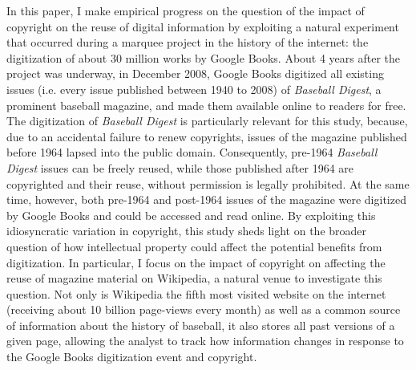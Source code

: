 \documentclass[11pt]{article}
\begin{document}
In this paper, I make empirical progress on the question of the impact of copyright on the reuse of digital information by exploiting a natural experiment that occurred during a marquee project in the history of the internet: the digitization of about 30 million works by Google Books. About 4 years after the project was underway, in December 2008, Google Books digitized all existing issues (i.e. every issue published between 1940 to 2008) of \emph{Baseball Digest}, a prominent baseball magazine, and made them available online to readers for free. The digitization of \emph{Baseball Digest} is particularly relevant for this study, because, due to an accidental failure to renew copyrights, issues of the magazine published before 1964 lapsed into the public domain. Consequently, pre-1964 \emph{Baseball Digest} issues can be freely reused, while those published after 1964 are copyrighted and their reuse, without permission is legally prohibited. At the same time, however, both pre-1964 and post-1964 issues of the magazine were digitized by Google Books and could be accessed and read online. By exploiting this idiosyncratic variation in copyright, this study sheds light on the broader question of how intellectual property could affect the potential benefits from digitization. In particular, I focus on the impact of copyright on affecting the reuse of magazine material on Wikipedia, a natural venue to investigate this question. Not only is Wikipedia the fifth most visited website on the internet (receiving about 10 billion page-views every month) as well as a common source of information about the history of baseball, it also stores all past versions of a given page, allowing the analyst to track how information changes in response to the Google Books digitization event and copyright. 
\end{document}
